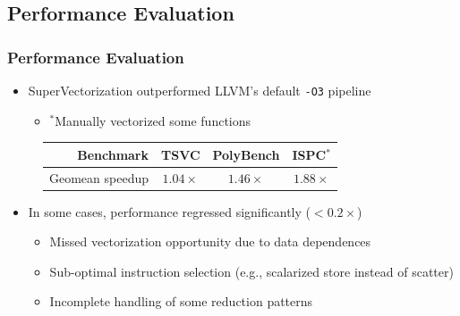 \documentclass[aspectratio=169]{beamer}
\begin{document}
\subsection{Performance Evaluation}
\begin{frame}
  \frametitle{Performance Evaluation}

  \begin{itemize}
    \item SuperVectorization outperformed LLVM's default \texttt{-O3} pipeline
    \begin{itemize}
      \item \({}^*\)Manually vectorized some functions
    \end{itemize}
  \end{itemize}
  \begin{figure}
  \centering
  \begin{tabular}{|r|ccc|}
  \hline
  Benchmark & TSVC & PolyBench & ISPC\({}^*\) \\ \hline
  Geomean speedup & \(1.04\times\) & \(1.46\times\) & \(1.88\times\) \\ \hline
  \end{tabular}
  \end{figure}
  \pause
  \begin{itemize}
    \item In some cases, performance regressed significantly (\(<0.2\times\))
    \begin{itemize}
      \item Missed vectorization opportunity due to data dependences
      \item Sub-optimal instruction selection (e.g., scalarized store instead of scatter)
      \item Incomplete handling of some reduction patterns
    \end{itemize}
  \end{itemize}
\end{frame}
\end{document}
